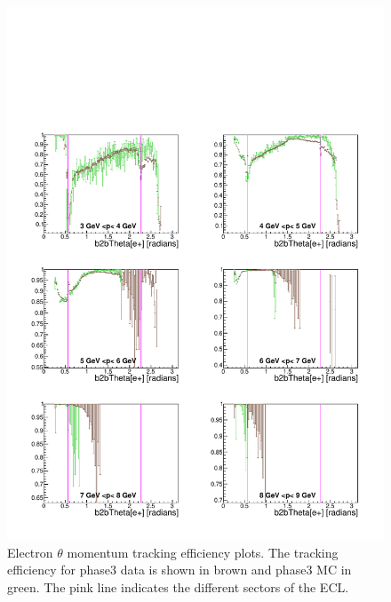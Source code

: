 \documentclass[a4paper,11pt,twosided,final,german,openbib,pdftex,listof=totoc,bibliography=totoc]{scrbook}
\begin{document}
\begin{figure}[!htbp]
	\centering
	\includegraphics[width=\textwidth]{Plots/master3/xPMThetaemP3}
	\caption[Momentum $\theta$ Electron Efficiency Phase3]{Electron $\theta$ momentum tracking efficiency plots. The tracking efficiency for phase3 data is shown in brown and phase3 MC in green. The pink line indicates the different sectors of the ECL.}
	
	\label{plt:xPMThetaem3}
\end{figure}
\end{document}
